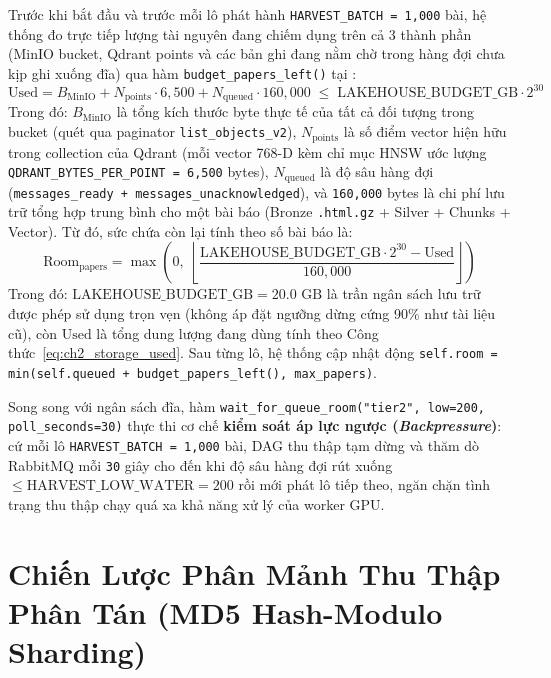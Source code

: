 Trước khi bắt đầu và trước mỗi lô phát hành \texttt{HARVEST\_BATCH = 1,000} bài, hệ thống đo trực tiếp lượng tài nguyên đang chiếm dụng trên cả 3 thành phần (MinIO bucket, Qdrant points và các bản ghi đang nằm chờ trong hàng đợi chưa kịp ghi xuống đĩa) qua hàm \texttt{budget\_papers\_left()} tại :
\begin{equation}
  \text{Used} = B_{\text{MinIO}} + N_{\text{points}} \cdot 6{,}500 + N_{\text{queued}} \cdot 160{,}000 \;\le\; \text{LAKEHOUSE\_BUDGET\_GB} \cdot 2^{30}
  \label{eq:ch2_storage_used}
\end{equation}
\noindent Trong đó: $B_{\text{MinIO}}$ là tổng kích thước byte thực tế của tất cả đối tượng trong bucket  (quét qua paginator \texttt{list\_objects\_v2}), $N_{\text{points}}$ là số điểm vector hiện hữu trong collection  của Qdrant (mỗi vector 768-D kèm chỉ mục HNSW ước lượng \texttt{QDRANT\_BYTES\_PER\_POINT = 6,500} bytes), $N_{\text{queued}}$ là độ sâu hàng đợi  (\texttt{messages\_ready + messages\_unacknowledged}), và \texttt{160,000} bytes là chi phí lưu trữ tổng hợp trung bình cho một bài báo (Bronze \texttt{.html.gz} + Silver + Chunks + Vector). Từ đó, sức chứa còn lại tính theo số bài báo là:
\begin{equation}
  \text{Room}_{\text{papers}} = \max\!\left(0,\; \left\lfloor \frac{\text{LAKEHOUSE\_BUDGET\_GB} \cdot 2^{30} - \text{Used}}{160{,}000} \right\rfloor\right)
  \label{eq:ch2_storage_room}
\end{equation}
\noindent Trong đó: $\text{LAKEHOUSE\_BUDGET\_GB} = 20.0\text{ GB}$ là trần ngân sách lưu trữ được phép sử dụng trọn vẹn (không áp đặt ngưỡng dừng cứng 90\% như tài liệu cũ), còn $\text{Used}$ là tổng dung lượng đang dùng tính theo Công thức~\eqref{eq:ch2_storage_used}. Sau từng lô, hệ thống cập nhật động \texttt{self.room = min(self.queued + budget\_papers\_left(), max\_papers)}.

Song song với ngân sách đĩa, hàm \texttt{wait\_for\_queue\_room("tier2", low=200, poll\_seconds=30)} thực thi cơ chế \textbf{kiểm soát áp lực ngược (\textit{Backpressure})}: cứ mỗi lô \texttt{HARVEST\_BATCH = 1,000} bài, DAG thu thập tạm dừng và thăm dò RabbitMQ mỗi \texttt{30} giây cho đến khi độ sâu hàng đợi  rút xuống $\le \text{HARVEST\_LOW\_WATER} = 200$ rồi mới phát lô tiếp theo, ngăn chặn tình trạng thu thập chạy quá xa khả năng xử lý của worker GPU.

\section{Chiến Lược Phân Mảnh Thu Thập Phân Tán (MD5 Hash-Modulo Sharding)}
\label{sec:ch2_sharding}

